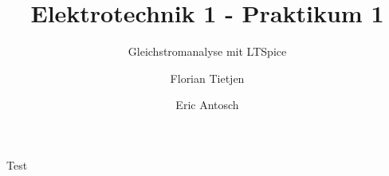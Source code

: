 \documentclass{scrarticle}
\title{Elektrotechnik 1 - Praktikum 1}
\subtitle{Gleichstromanalyse mit LTSpice}
\author{Florian Tietjen \and Eric Antosch}
\begin{document}
    Test
\end{document}

